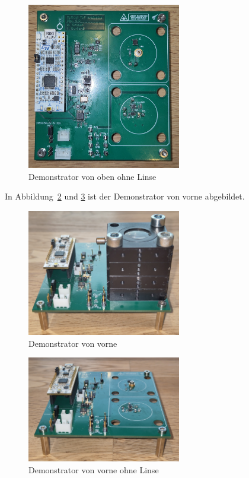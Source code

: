 \begin{figure}[H]
    \centering
    \includegraphics[width=0.6\textwidth]{graphics/photo_demonstrator_top_wo_lens.jpg}
    \caption{Demonstrator von oben ohne Linse}\label{fig:photo_demonstrator_top_wo_lens}
\end{figure}

In Abbildung~\ref{fig:photo_demonstrator_front} und \ref{fig:photo_demonstrator_front_wo_lens} ist der Demonstrator von vorne
abgebildet.

\begin{figure}[H]
    \centering
    \includegraphics[width=0.6\textwidth]{graphics/photo_demonstrator_front.jpg}
    \caption{Demonstrator von vorne}\label{fig:photo_demonstrator_front}
\end{figure}

\begin{figure}[H]
    \centering
    \includegraphics[width=0.6\textwidth]{graphics/photo_demonstrator_front_wo_lens.jpg}
    \caption{Demonstrator von vorne ohne Linse}\label{fig:photo_demonstrator_front_wo_lens}
\end{figure}

